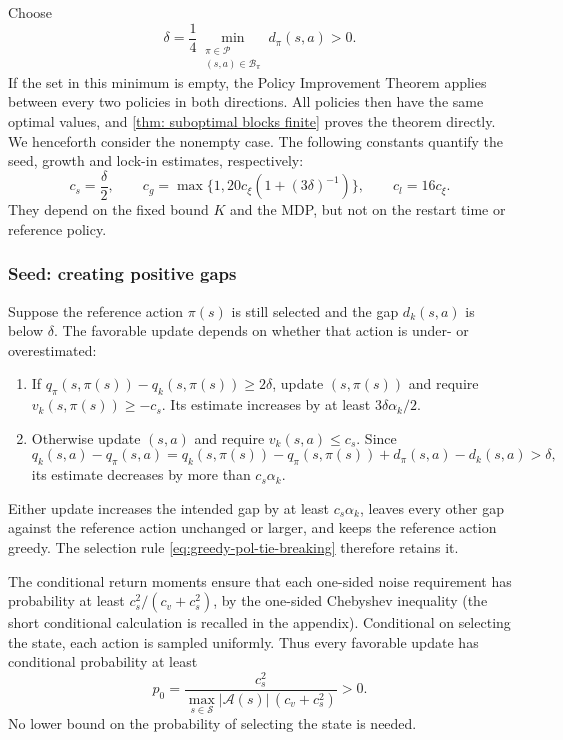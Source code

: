 Choose
\begin{equation}
\label{eq:constants}
\delta=\frac14\min_{\substack{\pi\in\mathcal P\\(s,a)\in\mathcal B_\pi}}d_\pi(s,a)>0.
\end{equation}
If the set in this minimum is empty, the Policy Improvement Theorem applies between every two policies in both directions. All policies then have the same optimal values, and \autoref{thm: suboptimal blocks finite} proves the theorem directly. We henceforth consider the nonempty case.
The following constants quantify the seed, growth and lock-in estimates, respectively:
\begin{equation}
\label{eq:c-def}
c_s=\frac\delta2,
\qquad c_g=\max\{1,20c_\xi(1+(3\delta)^{-1})\},
\qquad c_l=16c_\xi.
\end{equation}
They depend on the fixed bound $K$ and the MDP, but not on the restart time or reference policy.

\subsubsection{Seed: creating positive gaps}
Suppose the reference action $\pi(s)$ is still selected and the gap $d_k(s,a)$ is below $\delta$. The favorable update depends on whether that action is under- or overestimated:
\begin{enumerate}
\item If $q_\pi(s,\pi(s))-q_k(s,\pi(s))\ge2\delta$, update $(s,\pi(s))$ and require $v_k(s,\pi(s))\ge-c_s$. Its estimate increases by at least $3\delta\alpha_k/2$.
\item Otherwise update $(s,a)$ and require $v_k(s,a)\le c_s$. Since
\[
q_k(s,a)-q_\pi(s,a)
=q_k(s,\pi(s))-q_\pi(s,\pi(s))+d_\pi(s,a)-d_k(s,a)>\delta,
\]
its estimate decreases by more than $c_s\alpha_k$.
\end{enumerate}
Either update increases the intended gap by at least $c_s\alpha_k$, leaves every other gap against the reference action unchanged or larger, and keeps the reference action greedy. The selection rule \eqref{eq:greedy-pol-tie-breaking} therefore retains it.

The conditional return moments ensure that each one-sided noise requirement has probability at least $c_s^2/(c_v+c_s^2)$, by the one-sided Chebyshev inequality (the short conditional calculation is recalled in the appendix). Conditional on selecting the state, each action is sampled uniformly. Thus every favorable update has conditional probability at least
\begin{equation}
\label{eq:localprob}
p_0=\frac{c_s^2}{\max_{s\in\mathcal S}|\mathcal A(s)|\,(c_v+c_s^2)}>0.
\end{equation}
No lower bound on the probability of selecting the state is needed.

